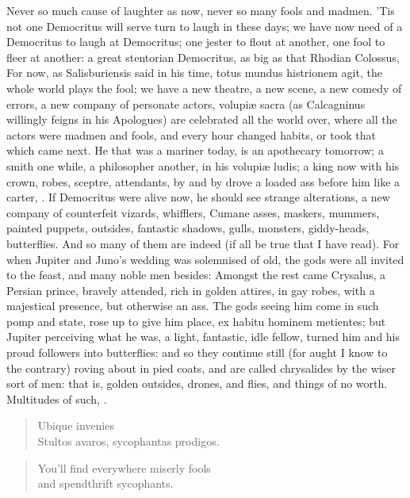 {Never so much cause of laughter as now, never so many fools and madmen.
'Tis not one Democritus will serve turn to laugh in these days; we
have now need of a Democritus to laugh at Democritus; one jester to
flout at another, one fool to fleer at another: a great stentorian
Democritus, as big as that Rhodian Colossus, For now, as
Salisburiensis said in his time, totus mundus histrionem agit, the
whole world plays the fool; we have a new theatre, a new scene, a new
comedy of errors, a new company of personate actors, volupi\ae{} sacra (as
Calcagninus willingly feigns in his Apologues) are celebrated all the
world over, where all the actors were madmen and fools, and every
hour changed habits, or took that which came next. He that was a
mariner today, is an apothecary tomorrow; a smith one while, a
philosopher another, in his volupi\ae{} ludis; a king now with his crown,
robes, sceptre, attendants, by and by drove a loaded ass before him
like a carter, \etc{}. If Democritus were alive now, he should see strange
alterations, a new company of counterfeit vizards, whifflers, Cumane
asses, maskers, mummers, painted puppets, outsides, fantastic shadows,
gulls, monsters, giddy-heads, butterflies. And so many of them are
indeed (if all be true that I have read). For when Jupiter and
Juno's wedding was solemnised of old, the gods were all invited to the
feast, and many noble men besides: Amongst the rest came Crysalus, a
Persian prince, bravely attended, rich in golden attires, in gay robes,
with a majestical presence, but otherwise an ass. The gods seeing him
come in such pomp and state, rose up to give him place, ex habitu
hominem metientes; but Jupiter perceiving what he was, a light,
fantastic, idle fellow, turned him and his proud followers into
butterflies: and so they continue still (for aught I know to the
contrary) roving about in pied coats, and are called chrysalides by the
wiser sort of men: that is, golden outsides, drones, and flies, and
things of no worth. Multitudes of such, \etc{}.
\settowidth{\versewidth}{Stultos avaros, sycophantas prodigos.}
\begin{verse}
\hspace{0.5\versewidth}Ubique invenies \\
Stultos avaros, sycophantas prodigos. \\
\end{verse}
 \begin{verse}
You'll find everywhere miserly fools \\
and spendthrift sycophants. \\
\end{verse}

}
